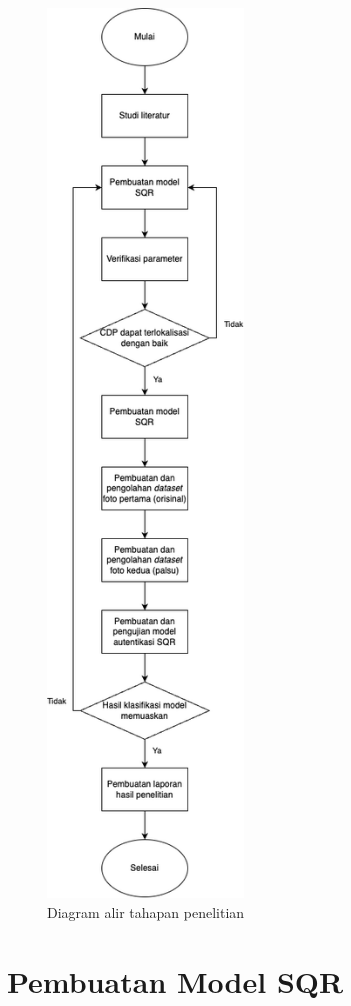\begin{figure}[h]
	\centering
	\includegraphics[width=5.2cm]{contents/chapter-3/3-flowchartfix.png}
	\caption{Diagram alir tahapan penelitian}
	\label{Fig: 3-diagramalirpenelitian}
\end{figure}

\clearpage

\section{Pembuatan Model SQR}
